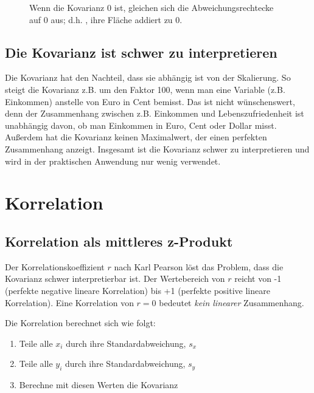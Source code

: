 \documentclass[
  letterpaper,
  twoside,
  open=any]{scrbook}
\providecommand{\tightlist}{%
  \setlength{\itemsep}{0pt}\setlength{\parskip}{0pt}}\usepackage{longtable,booktabs,array}
\theoremstyle{definition}
\theoremstyle{definition}
\theoremstyle{definition}
\theoremstyle{remark}
\begin{document}
\begin{figure}
\begin{minipage}{0.45\linewidth}
{}


\end{minipage}%

\caption{\label{fig-covnull}Wenn die Kovarianz 0 ist, gleichen sich die
Abweichungsrechtecke auf 0 aus; d.h. , ihre Fläche addiert zu 0.}

\end{figure}%

\subsection{Die Kovarianz ist schwer zu
interpretieren}\label{die-kovarianz-ist-schwer-zu-interpretieren}

Die Kovarianz hat den Nachteil, dass sie abhängig ist von der
Skalierung. So steigt die Kovarianz z.B. um den Faktor 100, wenn man
eine Variable (z.B. Einkommen) anstelle von Euro in Cent bemisst. Das
ist nicht wünschenswert, denn der Zusammenhang zwischen z.B. Einkommen
und Lebenszufriedenheit ist unabhängig davon, ob man Einkommen in Euro,
Cent oder Dollar misst. Außerdem hat die Kovarianz keinen Maximalwert,
der einen perfekten Zusammenhang anzeigt. Insgesamt ist die Kovarianz
schwer zu interpretieren und wird in der praktischen Anwendung nur wenig
verwendet.

\section{Korrelation}\label{korrelation}

\subsection{Korrelation als mittleres
z-Produkt}\label{korrelation-als-mittleres-z-produkt}

Der Korrelationskoeffizient \(r\) nach Karl Pearson löst das Problem,
dass die Kovarianz schwer interpretierbar ist. Der Wertebereich von
\(r\) reicht von -1 (perfekte negative lineare Korrelation) bis +1
(perfekte positive lineare Korrelation). Eine Korrelation von \(r = 0\)
bedeutet \emph{kein linearer} Zusammenhang.

Die Korrelation berechnet sich wie folgt:

\begin{enumerate}
\def\labelenumi{\arabic{enumi}.}
\tightlist
\item
  Teile alle \(x_i\) durch ihre Standardabweichung, \(s_x\)
\item
  Teile alle \(y_i\) durch ihre Standardabweichung, \(s_y\)
\item
  Berechne mit diesen Werten die Kovarianz
\end{enumerate}
\end{document}
